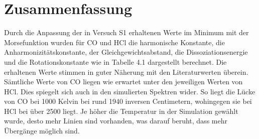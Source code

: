 
 
%
\section{Zusammenfassung}
Durch die Anpassung der in Versuch S1 erhaltenen Werte im Minimum mit der Morsefunktion wurden für CO und HCl die harmonische Konstante, die Anharmonizitätskonstante, der Gleichgewichtsabstand, die Dissoziationsenergie und die Rotationskonstante wie in Tabelle 4.1 dargestellt berechnet. Die erhaltenen Werte stimmen in guter Näherung mit den Literaturwerten überein. Sämtliche Werte von CO liegen wie erwartet unter den jeweiligen Werten von HCl. Dies spiegelt sich auch in den simulierten Spektren wider. So liegt die Lücke von CO bei 1000 Kelvin bei rund 1940 inversen Centimetern, wohingegen sie bei HCl bei über 2500 liegt. Je höher die Temperatur in der Simulation gewählt wurde, desto mehr Linien sind vorhanden, was darauf beruht, dass mehr Übergänge möglich sind.
%